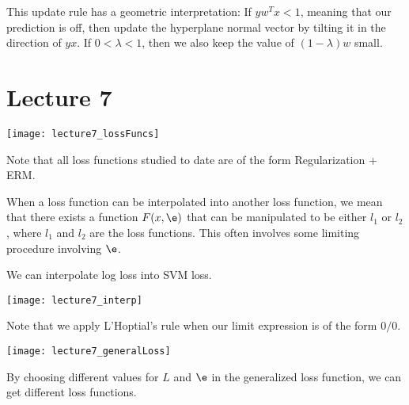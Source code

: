 \documentclass[../main.tex]{subfiles}
\begin{document}
\begin{remark}
    This update rule has a geometric interpretation: If $yw^Tx < 1$, meaning that our
    prediction is off, then update the hyperplane normal vector by tilting it in the direction
    of $yx$. If $0 < \lambda < 1$, then we also keep the value of $(1 - \lambda)w$ small.
\end{remark}

\section{Lecture 7}


\begin{remark}
    \begin{center}
        \texttt{[image: lecture7\_lossFuncs]}
    \end{center}

    Note that all loss functions studied to date are of the form Regularization  + ERM.
\end{remark}

\begin{definition}
    When a loss function can be interpolated into another loss function, we mean that there
    exists a function $F(x, \e)$ that can be manipulated to be either $l_1$ or $l_2$, where
    $l_1$ and $l_2$ are the loss functions. This often involves some limiting procedure involving $\e$.
\end{definition}

\begin{theorem}
    We can interpolate log loss into SVM loss.
\end{theorem}

\begin{remark}
    \begin{center}
        \texttt{[image: lecture7\_interp]}
    \end{center}

    Note that we apply L'Hoptial's rule when our limit expression is of the form $0/0$.
\end{remark}

\begin{remark}
    \begin{center}
        \texttt{[image: lecture7\_generalLoss]}
    \end{center}

    By choosing different values for $L$ and $\e$ in the generalized loss function, we can
    get different loss functions.
\end{remark}
\end{document}
